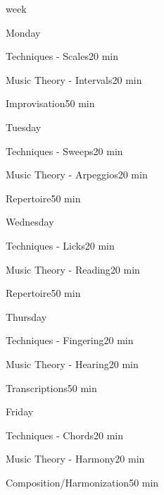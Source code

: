 \begin{task}{week}
  \begin{checklist}{Monday}
    \item{Techniques - Scales}{20 min}
    \item{Music Theory - Intervals}{20 min}
    \item{Improvisation}{50 min}
  \end{checklist}
  \begin{checklist}{Tuesday}
    \item{Techniques - Sweeps}{20 min}
    \item{Music Theory - Arpeggios}{20 min}
    \item{Repertoire}{50 min}
  \end{checklist}
  \begin{checklist}{Wednesday}
    \item{Techniques - Licks}{20 min}
    \item{Music Theory - Reading}{20 min}
    \item{Repertoire}{50 min}
  \end{checklist}
  \begin{checklist}{Thursday}
    \item{Techniques - Fingering}{20 min}
    \item{Music Theory - Hearing}{20 min}
    \item{Transcriptions}{50 min}
  \end{checklist}
  \begin{checklist}{Friday}
    \item{Techniques - Chords}{20 min}
    \item{Music Theory - Harmony}{20 min}
    \item{Composition/Harmonization}{50 min}
  \end{checklist}

\end{task}


